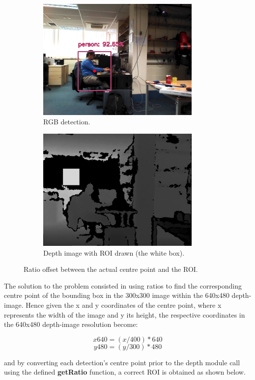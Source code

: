 \begin{figure}[H]
	\centering
    \begin{subfigure}{.6\textwidth}
      \centering
      \includegraphics[width=8cm]{images/chapter4_rgb_ratio.png}
      \caption{RGB detection.}
      \label{fig:ratin}
    \end{subfigure}%
    
    \begin{subfigure}{.6\textwidth}
      \centering
      \includegraphics[width=8cm]{images/chapter4_rgbd_no_ratio.png}
      \caption{Depth image with ROI drawn (the white box).}
      \label{fig:ration}
    \end{subfigure}%
    
    \caption{Ratio offset between the actual centre point and the ROI.}
\end{figure}
\clearpage

The solution to the problem consisted in using ratios to find the corresponding centre point of the bounding box in the 300x300 image within the 640x480 depth-image. Hence given the x and y coordinates of the centre point, where x represents the width of the image and y its height, the respective coordinates in the 640x480 depth-image resolution become:

\[x640 = (x/400) * 640 \]
\[y480 = (y/300) * 480 \]

and by converting each detection's centre point prior to the depth module call using the defined \textbf{getRatio} function, a correct ROI is obtained as shown below.

